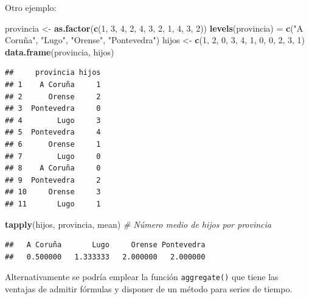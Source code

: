 \documentclass[
]{book}
\newenvironment{Shaded}{\begin{snugshade}}{\end{snugshade}}
\newcommand{\CommentTok}[1]{\textcolor[rgb]{0.56,0.35,0.01}{\textit{#1}}}
\newcommand{\DecValTok}[1]{\textcolor[rgb]{0.00,0.00,0.81}{#1}}
\newcommand{\KeywordTok}[1]{\textcolor[rgb]{0.13,0.29,0.53}{\textbf{#1}}}
\newcommand{\NormalTok}[1]{#1}
\newcommand{\StringTok}[1]{\textcolor[rgb]{0.31,0.60,0.02}{#1}}
\begin{document}
Otro ejemplo:

\begin{Shaded}
\begin{Highlighting}[]
\NormalTok{provincia <-}\StringTok{ }\KeywordTok{as.factor}\NormalTok{(}\KeywordTok{c}\NormalTok{(}\DecValTok{1}\NormalTok{, }\DecValTok{3}\NormalTok{, }\DecValTok{4}\NormalTok{, }\DecValTok{2}\NormalTok{, }\DecValTok{4}\NormalTok{, }\DecValTok{3}\NormalTok{, }\DecValTok{2}\NormalTok{, }\DecValTok{1}\NormalTok{, }\DecValTok{4}\NormalTok{, }\DecValTok{3}\NormalTok{, }\DecValTok{2}\NormalTok{))}
\KeywordTok{levels}\NormalTok{(provincia) =}\StringTok{ }\KeywordTok{c}\NormalTok{(}\StringTok{"A Coruña"}\NormalTok{, }\StringTok{"Lugo"}\NormalTok{, }\StringTok{"Orense"}\NormalTok{, }\StringTok{"Pontevedra"}\NormalTok{)}
\NormalTok{hijos <-}\StringTok{ }\KeywordTok{c}\NormalTok{(}\DecValTok{1}\NormalTok{, }\DecValTok{2}\NormalTok{, }\DecValTok{0}\NormalTok{, }\DecValTok{3}\NormalTok{, }\DecValTok{4}\NormalTok{, }\DecValTok{1}\NormalTok{, }\DecValTok{0}\NormalTok{, }\DecValTok{0}\NormalTok{, }\DecValTok{2}\NormalTok{, }\DecValTok{3}\NormalTok{, }\DecValTok{1}\NormalTok{)}
\KeywordTok{data.frame}\NormalTok{(provincia, hijos)}
\end{Highlighting}
\end{Shaded}

\begin{verbatim}
##     provincia hijos
## 1    A Coruña     1
## 2      Orense     2
## 3  Pontevedra     0
## 4        Lugo     3
## 5  Pontevedra     4
## 6      Orense     1
## 7        Lugo     0
## 8    A Coruña     0
## 9  Pontevedra     2
## 10     Orense     3
## 11       Lugo     1
\end{verbatim}

\begin{Shaded}
\begin{Highlighting}[]
\KeywordTok{tapply}\NormalTok{(hijos, provincia, mean) }\CommentTok{# Número medio de hijos por provincia}
\end{Highlighting}
\end{Shaded}

\begin{verbatim}
##   A Coruña       Lugo     Orense Pontevedra 
##   0.500000   1.333333   2.000000   2.000000
\end{verbatim}

Alternativamente se podría emplear la función \texttt{aggregate()} que tiene las ventajas de admitir fórmulas y disponer de un método para series de tiempo.
\end{document}
